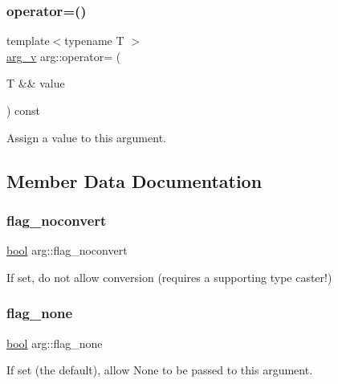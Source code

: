 \mbox{\label{structarg_af21c066dfb7fe62ff952a8ea4713b7ed}} 
\subsubsection{\texorpdfstring{operator=()}{operator=()}}
{\footnotesize\ttfamily template$<$typename T $>$ \\
\mbox{\hyperlink{structarg__v}{arg\+\_\+v}} arg\+::operator= (\begin{DoxyParamCaption}\item[{T \&\&}]{value }\end{DoxyParamCaption}) const}



Assign a value to this argument. 



\subsection{Member Data Documentation}
\mbox{\label{structarg_af69a71cd0c34cbce3ef8705e7b7da817}} 
\subsubsection{\texorpdfstring{flag\_noconvert}{flag\_noconvert}}
{\footnotesize\ttfamily \mbox{\hyperlink{asdl_8h_af6a258d8f3ee5206d682d799316314b1}{bool}} arg\+::flag\+\_\+noconvert}



If set, do not allow conversion (requires a supporting type caster!) 

\mbox{\label{structarg_a57121005d089a7b05536d320ebc9d32f}} 
\subsubsection{\texorpdfstring{flag\_none}{flag\_none}}
{\footnotesize\ttfamily \mbox{\hyperlink{asdl_8h_af6a258d8f3ee5206d682d799316314b1}{bool}} arg\+::flag\+\_\+none}



If set (the default), allow None to be passed to this argument. 

